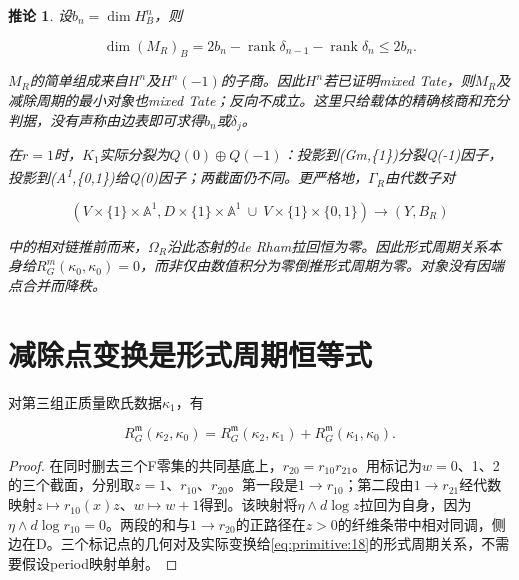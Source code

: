 \documentclass[11pt,a4paper,oneside]{ctexrep}
\theoremstyle{cnplain}
\newtheorem{corollary}[theorem]{推论}
\theoremstyle{definition}
\theoremstyle{remark}
\begin{document}
\begin{corollary}

\label{thm:primitive:5.1} 设\(b_n=\operatorname{dim} H^n_B\)，则

\begin{equation}
\dim(M_R)_B=2b_n-\operatorname{rank}\delta_{n-1}
                         -\operatorname{rank}\delta_n\le2b_n.               \label{eq:primitive:17}
\end{equation}

\(M_R\)的简单组成来自\(H^n\)及\(H^n(-1)\)的子商。因此\(H^n\)若已证明mixed Tate，则\(M_R\)及减除周期的最小对象也mixed Tate；反向不成立。这里只给载体的精确核商和充分判据，没有声称由边表即可求得\(b_n\)或\(\delta _j\)。

在\(r=1\)时，\(K_1\)实际分裂为\(Q(0)\oplus Q(-1)\)：投影到(Gm,\{1\})分裂Q(-1)因子，投影到(A\textsuperscript{1},\{0,1\})给Q(0)因子；两截面仍不同。更严格地，\(\Gamma _R\)由代数子对

\begin{equation}
(V\times\{1\}\times\mathbb A^1,
 D\times\{1\}\times\mathbb A^1\ \cup\ V\times\{1\}\times\{0,1\})
                       \longrightarrow(Y,B_R)
\end{equation}

中的相对链推前而来，\(\Omega _R\)沿此态射的de Rham拉回恒为零。因此形式周期关系本身给\(R_G^m(\kappa _0,\kappa _0)=0\)，而非仅由数值积分为零倒推形式周期为零。对象没有因端点合并而降秩。

\end{corollary}

\section{减除点变换是形式周期恒等式}\label{sec:primitive:6}

对第三组正质量欧氏数据\(\kappa _1\)，有

\begin{equation}
R_G^{\mathfrak m}(\kappa_2,\kappa_0)
 =R_G^{\mathfrak m}(\kappa_2,\kappa_1)
                         +R_G^{\mathfrak m}(\kappa_1,\kappa_0).              \label{eq:primitive:18}
\end{equation}

\begin{proof}

在同时删去三个F零集的共同基底上，\(r_{20}=r_{10}r_{21}\)。用标记为\(w=0\)、1、2的三个截面，分别取\(z=1\)、\(r_{10}\)、\(r_{20}\)。第一段是\(1\to r_{10}\)；第二段由\(1\to r_{21}\)经代数映射\(z\mapsto r_{10}(x)z\)、\(w\mapsto w+1\)得到。该映射将\(\eta \wedge d\log  z\)拉回为自身，因为\(\eta \wedge d\log  r_{10}=0\)。两段的和与\(1\to r_{20}\)的正路径在\(z>0\)的纤维条带中相对同调，侧边在D。三个标记点的几何对及实际变换给\eqref{eq:primitive:18}的形式周期关系，不需要假设period映射单射。

\end{proof}
\end{document}
